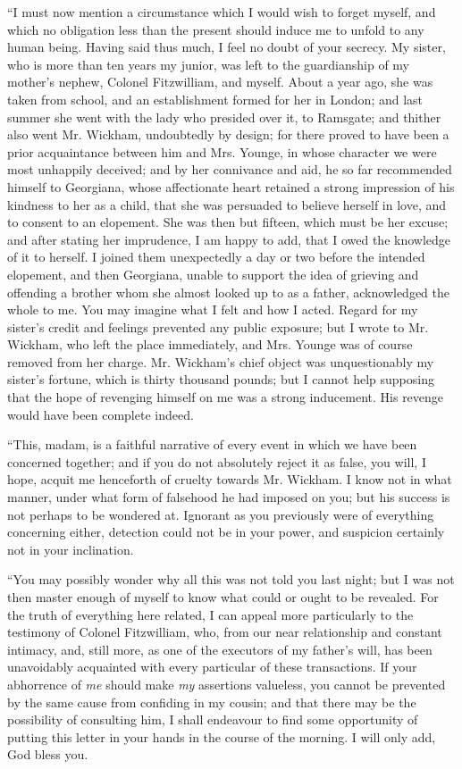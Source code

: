 “I must now mention a circumstance which I would wish to forget myself, and which no obligation less than the present should induce me to unfold to any human being. Having said thus much, I feel no doubt of your secrecy. My sister, who is more than ten years my junior, was left to the guardianship of my mother's nephew, Colonel Fitzwilliam, and myself. About a year ago, she was taken from school, and an establishment formed for her in London; and last summer she went with the lady who presided over it, to Ramsgate; and thither also went Mr. Wickham, undoubtedly by design; for there proved to have been a prior acquaintance between him and Mrs. Younge, in whose character we were most unhappily deceived; and by her connivance and aid, he so far recommended himself to Georgiana, whose affectionate heart retained a strong impression of his kindness to her as a child, that she was persuaded to believe herself in love, and to consent to an elopement. She was then but fifteen, which must be her excuse; and after stating her imprudence, I am happy to add, that I owed the knowledge of it to herself. I joined them unexpectedly a day or two before the intended elopement, and then Georgiana, unable to support the idea of grieving and offending a brother whom she almost looked up to as a father, acknowledged the whole to me. You may imagine what I felt and how I acted. Regard for my sister's credit and feelings prevented any public exposure; but I wrote to Mr. Wickham, who left the place immediately, and Mrs. Younge was of course removed from her charge. Mr. Wickham's chief object was unquestionably my sister's fortune, which is thirty thousand pounds; but I cannot help supposing that the hope of revenging himself on me was a strong inducement. His revenge would have been complete indeed.

“This, madam, is a faithful narrative of every event in which we have been concerned together; and if you do not absolutely reject it as false, you will, I hope, acquit me henceforth of cruelty towards Mr. Wickham. I know not in what manner, under what form of falsehood he had imposed on you; but his success is not perhaps to be wondered at. Ignorant as you previously were of everything concerning either, detection could not be in your power, and suspicion certainly not in your inclination.

“You may possibly wonder why all this was not told you last night; but I was not then master enough of myself to know what could or ought to be revealed. For the truth of everything here related, I can appeal more particularly to the testimony of Colonel Fitzwilliam, who, from our near relationship and constant intimacy, and, still more, as one of the executors of my father's will, has been unavoidably acquainted with every particular of these transactions. If your abhorrence of {\em me} should make {\em my} assertions valueless, you cannot be prevented by the same cause from confiding in my cousin; and that there may be the possibility of consulting him, I shall endeavour to find some opportunity of putting this letter in your hands in the course of the morning. I will only add, God bless you.

